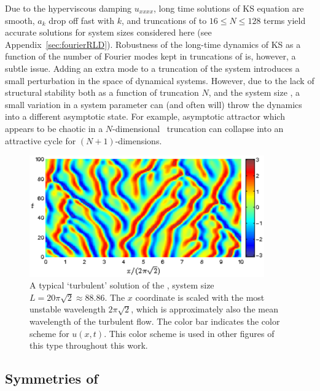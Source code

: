 Due to the hyperviscous damping $u_{xxxx}$, long time solutions of KS
equation are smooth, $a_k$ drop off fast
with $k$, and truncations of  to $16 \leq N \leq 128$
terms yield accurate solutions for system sizes considered here (see
Appendix~\ref{sec:fourierRLD}).  Robustness of the long-time dynamics
of KS as a function of the number of Fourier modes kept in truncations
of  is, however, a subtle issue.  Adding an extra mode to
a truncation of the system introduces a small perturbation in the
space of dynamical systems.  However, due to the lack of structural
stability both as a function of truncation $N$, and the system size
\tildeL, a small variation in a system parameter can (and often will)
throw the dynamics into a different asymptotic state.  For example,
asymptotic attractor which appears to be chaotic in a $N$-dimensional
\statesp\ truncation can collapse into an attractive cycle
for $(N\!+\!1)$-dimensions.

\begin{figure}[t]
\begin{center}
\includegraphics[width=0.9\textwidth]{figs_bmp/ks_largeL_cbar.eps}
\end{center}
\caption{
A typical `turbulent' solution of the \KSe, system size
$L=20\pi\sqrt{2}\approx 88.86$.  The $x$ coordinate is scaled
with the most unstable wavelength $2\pi\sqrt{2}$, which is
approximately also the mean wavelength of the turbulent flow.
The color bar indicates the color scheme for $u(x,t)$.  This color
scheme is used in other figures of this type throughout this work.
     } \label{f:ks_largeL}
\end{figure}

\subsection{Symmetries of \KSe}
\label{sec:KSeSymm}

